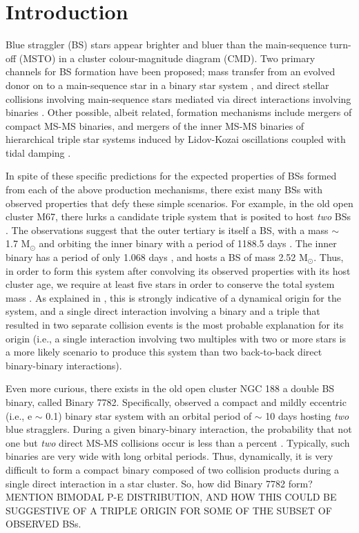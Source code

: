 \documentclass[useAMS,usenatbib]{mnras}
\begin{document}
\section{Introduction}

Blue straggler (BS) stars appear brighter and bluer than the main-sequence turn-off (MSTO) in a cluster colour-magnitude diagram (CMD).  Two primary channels for BS formation have been proposed; mass transfer from an evolved donor on to a main-sequence star in a binary star system \citep[e.g.][]{mccrea64,knigge09,leigh11,gosnell14,gosnell15}, and direct stellar collisions involving main-sequence stars mediated via direct interactions involving binaries \citep[e.g.][]{hills75,shara97,leigh13,hypki13}.  Other possible, albeit related, formation mechanisms include mergers of compact MS-MS binaries, and mergers of the inner MS-MS binaries of hierarchical triple star systems induced by Lidov-Kozai oscillations coupled with tidal damping \citep[e.g.][]{perets09}.  

In spite of these specific predictions for the expected properties of BSs formed from each of the above production mechanisms, there exist many BSs with observed properties that defy these simple scenarios.  For example, in the old open cluster M67, there lurks a candidate triple system that is posited to host \textit{two} BSs \citep{vandenberg01,sandquist03}.  The observations suggest that the outer tertiary is itself a BS, with a mass $\sim$ 1.7 M$_{\odot}$ and orbiting the inner binary with a period of 1188.5 days \citep{sandquist03}.  The inner binary has a period of only 1.068 days \citep{vandenberg01}, and hosts a BS of mass 2.52 M$_{\odot}$.  Thus, in order to form this system after convolving its observed properties with its host cluster age, we require at least five stars in order to conserve the total system mass \citep{leigh11}.  As explained in \citet{leigh11}, this is strongly indicative of a dynamical origin for the system, and a single direct interaction involving a binary and a triple that resulted in two separate collision events is the most probable explanation for its origin (i.e., a single interaction involving two multiples with two or more stars is a more likely scenario to produce this system than two back-to-back direct binary-binary interactions).  

Even more curious, there exists in the old open cluster NGC 188 a double BS binary, called Binary 7782.  Specifically, \citet{mathieu09} observed a compact and mildly eccentric (i.e., e $\sim$ 0.1) binary star system with an orbital period of $\sim$ 10 days hosting \textit{two} blue stragglers.  During a given binary-binary interaction, the probability that not one but \textit{two} direct MS-MS collisions occur is less than a percent \citep{leonard89,leigh11,leigh12}.  Typically, such binaries are very wide with long orbital periods.  Thus, dynamically, it is very difficult to form a compact binary composed of two collision products during a single direct interaction in a star cluster.  So, how did Binary 7782 form?  MENTION BIMODAL P-E DISTRIBUTION, AND HOW THIS COULD BE SUGGESTIVE OF A TRIPLE ORIGIN FOR SOME OF THE SUBSET OF OBSERVED BSs.
\end{document}
